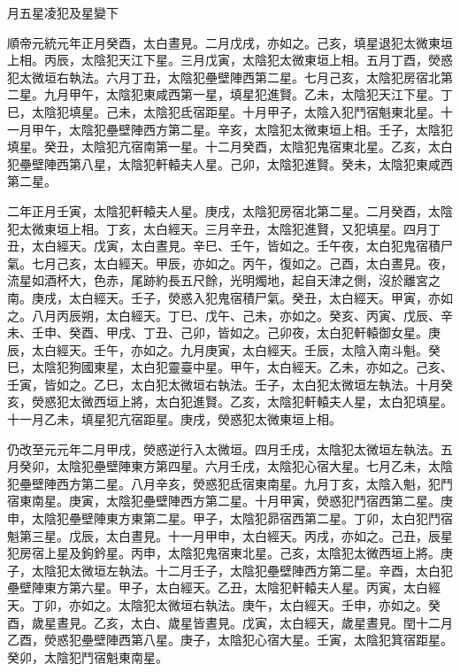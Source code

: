 
\begin{pinyinscope}

 月五星凌犯及星變下



 順帝元統元年正月癸酉，太白晝見。二月戊戌，亦如之。己亥，填星退犯太微東垣上相。丙辰，太陰犯天江下星。三月戊寅，太陰犯太微東垣上相。五月丁酉，熒惑犯太微垣右執法。六月丁丑，太陰犯壘壁陣西第二星。七月己亥，太陰犯房宿北第二星。九月甲午，太陰犯東咸西第一星，填星犯進賢。乙未，太陰犯天江下星。丁巳，太陰犯填星。己未，太陰犯氐宿距星。十月甲子，太陰入犯鬥宿魁東北星。十一月甲午，太陰犯壘壁陣西方第二星。辛亥，太陰犯太微東垣上相。壬子，太陰犯填星。癸丑，太陰犯亢宿南第一星。十二月癸酉，太陰犯鬼宿東北星。乙亥，太白犯壘壁陣西第八星，太陰犯軒轅夫人星。己卯，太陰犯進賢。癸未，太陰犯東咸西第二星。



 二年正月壬寅，太陰犯軒轅夫人星。庚戌，太陰犯房宿北第二星。二月癸酉，太陰犯太微東垣上相。丁亥，太白經天。三月辛丑，太陰犯進賢，又犯填星。四月丁丑，太白經天。戊寅，太白晝見。辛巳、壬午，皆如之。壬午夜，太白犯鬼宿積尸氣。七月己亥，太白經天。甲辰，亦如之。丙午，復如之。己酉，太白晝見。夜，流星如酒杯大，色赤，尾跡約長五尺餘，光明燭地，起自天津之側，沒於離宮之南。庚戌，太白經天。壬子，熒惑入犯鬼宿積尸氣。癸丑，太白經天。甲寅，亦如之。八月丙辰朔，太白經天。丁巳、戊午、己未，亦如之。癸亥、丙寅、戊辰、辛未、壬申、癸酉、甲戌、丁丑、己卯，皆如之。己卯夜，太白犯軒轅御女星。庚辰，太白經天。壬午，亦如之。九月庚寅，太白經天。壬辰，太陰入南斗魁。癸巳，太陰犯狗國東星，太白犯靈臺中星。甲午，太白經天。乙未，亦如之。己亥、壬寅，皆如之。乙巳，太白犯太微垣右執法。壬子，太白犯太微垣左執法。十月癸亥，熒惑犯太微西垣上將，太白犯進賢。乙亥，太陰犯軒轅夫人星，太白犯填星。十一月乙未，填星犯亢宿距星。庚戌，熒惑犯太微東垣上相。



 仍改至元元年二月甲戌，熒惑逆行入太微垣。四月壬戌，太陰犯太微垣左執法。五月癸卯，太陰犯壘壁陣東方第四星。六月壬戌，太陰犯心宿大星。七月乙未，太陰犯壘壁陣西方第二星。八月辛亥，熒惑犯氐宿東南星。九月丁亥，太陰入魁，犯鬥宿東南星。庚寅，太陰犯壘壁陣西方第二星。十月甲寅，熒惑犯鬥宿西第二星。庚申，太陰犯壘壁陣東方東第二星。甲子，太陰犯昴宿西第二星。丁卯，太白犯鬥宿魁第三星。戊辰，太白晝見。十一月甲申，太白經天。丙戌，亦如之。己丑，辰星犯房宿上星及鉤鈐星。丙申，太陰犯鬼宿東北星。己亥，太陰犯太微西垣上將。庚子，太陰犯太微垣左執法。十二月壬子，太陰犯壘壁陣西方第二星。辛酉，太白犯壘壁陣東方第六星。甲子，太白經天。乙丑，太陰犯軒轅夫人星。丙寅，太白經天。丁卯，亦如之。太陰犯太微垣右執法。庚午，太白經天。壬申，亦如之。癸酉，歲星晝見。乙亥，太白、歲星皆晝見。戊寅，太白經天，歲星晝見。閏十二月乙酉，熒惑犯壘壁陣西第八星。庚子，太陰犯心宿大星。壬寅，太陰犯箕宿距星。癸卯，太陰犯鬥宿魁東南星。




\end{pinyinscope}
